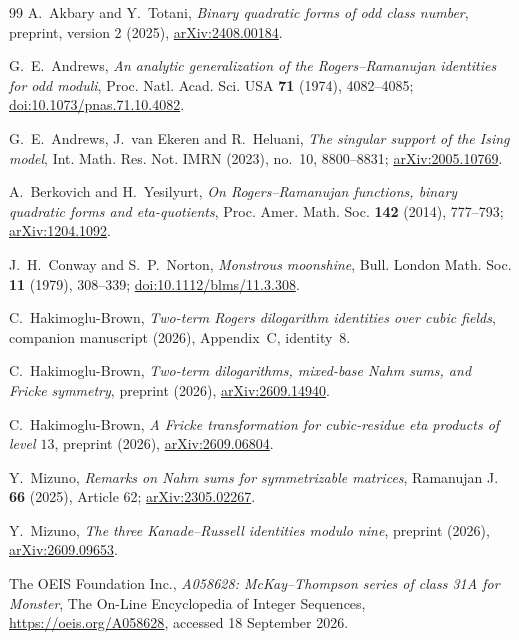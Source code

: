 \documentclass[11pt,reqno]{amsart}
\theoremstyle{remark}
\numberwithin{equation}{section}
\begin{document}
\begin{thebibliography}{99}
A.~Akbary and Y.~Totani,
\emph{Binary quadratic forms of odd class number},
preprint, version 2 (2025),
\href{https://arxiv.org/abs/2408.00184}{arXiv:2408.00184}.

G.~E.~Andrews,
\emph{An analytic generalization of the Rogers--Ramanujan identities for odd moduli},
Proc. Natl. Acad. Sci. USA \textbf{71} (1974), 4082--4085;
\href{https://doi.org/10.1073/pnas.71.10.4082}{doi:10.1073/pnas.71.10.4082}.

G.~E.~Andrews, J.~van Ekeren and R.~Heluani,
\emph{The singular support of the Ising model},
Int. Math. Res. Not. IMRN (2023), no.~10, 8800--8831;
\href{https://arxiv.org/abs/2005.10769}{arXiv:2005.10769}.

A.~Berkovich and H.~Yesilyurt,
\emph{On Rogers--Ramanujan functions, binary quadratic forms and eta-quotients},
Proc. Amer. Math. Soc. \textbf{142} (2014), 777--793;
\href{https://arxiv.org/abs/1204.1092}{arXiv:1204.1092}.

J.~H.~Conway and S.~P.~Norton,
\emph{Monstrous moonshine},
Bull. London Math. Soc. \textbf{11} (1979), 308--339;
\href{https://doi.org/10.1112/blms/11.3.308}{doi:10.1112/blms/11.3.308}.

C.~Hakimoglu-Brown,
\emph{Two-term Rogers dilogarithm identities over cubic fields},
companion manuscript (2026), Appendix~C, identity~8.

C.~Hakimoglu-Brown,
\emph{Two-term dilogarithms, mixed-base Nahm sums, and Fricke symmetry},
preprint (2026),
\href{https://arxiv.org/abs/2609.14940}{arXiv:2609.14940}.

C.~Hakimoglu-Brown,
\emph{A Fricke transformation for cubic-residue eta products of level $13$},
preprint (2026),
\href{https://arxiv.org/abs/2609.06804}{arXiv:2609.06804}.

Y.~Mizuno,
\emph{Remarks on Nahm sums for symmetrizable matrices},
Ramanujan J. \textbf{66} (2025), Article 62;
\href{https://arxiv.org/abs/2305.02267}{arXiv:2305.02267}.

Y.~Mizuno,
\emph{The three Kanade--Russell identities modulo nine},
preprint (2026),
\href{https://arxiv.org/abs/2609.09653}{arXiv:2609.09653}.

The OEIS Foundation Inc.,
\emph{A058628: McKay--Thompson series of class 31A for Monster},
The On-Line Encyclopedia of Integer Sequences,
\url{https://oeis.org/A058628}, accessed 18 September 2026.


\end{thebibliography}
\end{document}
